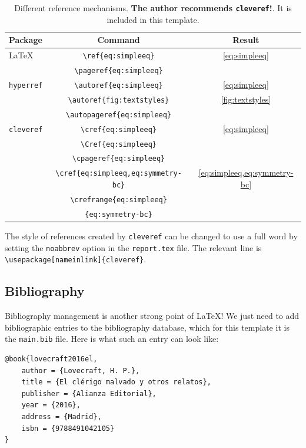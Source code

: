 \begin{table}[h]
	\centering
	\begin{tabular}{lcc}
	  \toprule
	  Package & Command & Result \\
	  \midrule
	  \LaTeX & \verb|\ref{eq:simpleeq}| & \ref{eq:simpleeq} \\
	  & \verb|\pageref{eq:simpleeq}| & \pageref{eq:simpleeq} \\
	  \cmidrule{2-3}
	  \texttt{hyperref} & \verb|\autoref{eq:simpleeq}| & \autoref{eq:simpleeq} \\
			  & \verb|\autoref{fig:textstyles}| & \autoref{fig:textstyles} \\
			  & \verb|\autopageref{eq:simpleeq}| & \autopageref{eq:simpleeq} \\
	  \cmidrule{2-3}
	  \texttt{cleveref} & \verb|\cref{eq:simpleeq}| & \cref{eq:simpleeq} \\
			  & \verb|\Cref{eq:simpleeq}| & \Cref{eq:simpleeq} \\
	  & \verb|\cpageref{eq:simpleeq}| & \cpageref{eq:simpleeq} \\
			  & \verb|\cref{eq:simpleeq,eq:symmetry-bc}| & \cref{eq:simpleeq,eq:symmetry-bc} \\
			  & \verb|\crefrange{eq:simpleeq}| & \multirow{2}{*}{\crefrange{eq:simpleeq}{eq:symmetry-bc}}\\
	  & \verb|{eq:symmetry-bc}| & \\
	  \bottomrule
	\end{tabular}
	\caption[Different reference mechanisms.]{Different reference mechanisms. \textbf{The author recommends \texttt{cleveref}!}. It is included in this template.}
	\label{tab:reference-systems}
\end{table}

The style of references created by \texttt{cleveref} can be changed to use a full word by setting the \texttt{noabbrev} option in the \texttt{report.tex} file. The relevant line is \verb|\usepackage[nameinlink]{cleveref}|.

\subsection{Bibliography}

Bibliography management is another strong point of \LaTeX! We just need to add bibliographic entries to the bibliography database, which for this template it is the \texttt{main.bib} file. Here is what such an entry can look like:

\begin{lstlisting}[language={[LaTeX]TeX}]
@book{lovecraft2016el,
	author = {Lovecraft, H. P.},
	title = {El clérigo malvado y otros relatos},
	publisher = {Alianza Editorial},
	year = {2016},
	address = {Madrid},
	isbn = {9788491042105}
}
\end{lstlisting}

